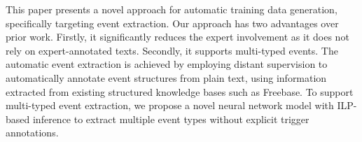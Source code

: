

This paper presents a novel approach for automatic training data generation, specifically targeting event extraction. Our approach has two advantages over prior work\FIXME{\cite{}}. Firstly, it significantly reduces the expert involvement as it does not rely on expert-annotated texts. Secondly, it supports multi-typed events. The automatic event extraction is achieved by employing distant supervision to automatically annotate event structures from plain text, using information extracted from existing structured knowledge bases such as Freebase. To support multi-typed event extraction, we propose a novel neural network model with ILP-based inference to extract multiple event types without explicit trigger annotations.



